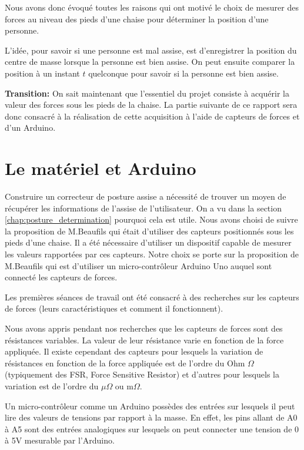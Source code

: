 \documentclass{polytech/polytech}
\begin{document}
Nous avons donc évoqué toutes les raisons qui ont motivé le choix de mesurer des forces au niveau des pieds d'une chaise pour déterminer la position d'une personne.

L'idée, pour savoir si une personne est mal assise, est d'enregistrer la position du centre de masse lorsque la personne est bien assise. On peut ensuite comparer la position à un instant $t$ quelconque pour savoir si la personne est bien assise.

\textbf{Transition:} On sait maintenant que l'essentiel du projet consiste à acquérir la valeur des forces sous les pieds de la chaise. La partie suivante de ce rapport sera donc consacré à la réalisation de cette acquisition à l'aide de capteurs de forces et d'un Arduino.

\section{Le matériel et Arduino}
\label{chap:arduino}

Construire un correcteur de posture assise a nécessité de trouver un moyen de récupérer les informations de l'assise de l'utilisateur. On a vu dans la section \ref{chap:posture_determination} pourquoi cela est utile. Nous avons choisi de suivre la proposition de M.Beaufils qui était d'utiliser des capteurs positionnés sous les pieds d'une chaise. Il a été nécessaire d'utiliser un dispositif capable de mesurer les valeurs rapportées par ces capteurs. Notre choix se porte sur la proposition de M.Beaufils qui est d'utiliser un  micro-contrôleur Arduino Uno auquel sont connecté les capteurs de forces. 

Les premières séances de travail ont été consacré à des recherches sur les capteurs de forces (leurs caractéristiques et comment il fonctionnent). 

Nous avons appris pendant nos recherches que les capteurs de forces sont des résistances variables. La valeur de leur résistance varie en fonction de la force appliquée. Il existe cependant des capteurs pour lesquels la variation de résistances en fonction de la force appliquée est de l'ordre du Ohm $\Omega$ (typiquement des FSR, Force Sensitive Resistor) et d'autres pour lesquels la variation est de l'ordre du $\mu \Omega$ ou $\mathrm{m} \Omega$.

Un micro-contrôleur comme un Arduino possèdes des entrées sur lesquels il peut lire des valeurs de tensions par rapport à la masse. En effet, les pins allant de A0 à A5 sont des entrées analogiques sur lesquels on peut connecter une tension de 0 à 5V mesurable par l'Arduino. 
\end{document}
